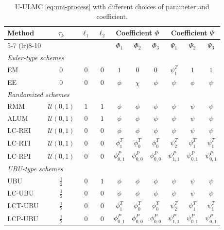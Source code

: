 \documentclass[12pt]{article}
\numberwithin{equation}{section}
\begin{document}
\begin{table}[!htb]
    \centering
    \caption{U-ULMC \eqref{eq:uni-process} with different choices of parameter and coefficient.}
    \label{tab:unified-ulmc}
    \renewcommand{\arraystretch}{1.25}
    \setlength{\tabcolsep}{3.5pt}
    \small
    \begin{tabular*}{\textwidth}{@{\extracolsep{\fill}} lccccccccc @{}}
        \toprule
        \multirow{2}{*}{Method} & \multirow{2}{*}{$\tau_k$} & \multirow{2}{*}{$\ell_1$} & \multirow{2}{*}{$\ell_2$} & \multicolumn{3}{c}{Coefficient $\Phi$} & \multicolumn{3}{c}{Coefficient $\Psi$} \\
        \cmidrule(lr){5-7} \cmidrule(lr){8-10}
        & & & & $\Phi_1$ & $\Phi_2$ & $\Phi_3$ & $\Psi_1$ & $\Psi_2$ & $\Psi_3$ \\
        \midrule
        \multicolumn{10}{l}{\textit{Euler-type schemes}} \\
        \addlinespace[2pt]
        EM  & $0$ & $0$ & $0$ & $1$ & $0$ & $0$ & $\psi^{T}_1$ & $1$ & $1$ \\
        EE  & $0$ & $0$ & $0$ & $\phi$ & $\chi$ & $\phi$ & $\psi$ & $\phi$ & $\psi$ \\
        \midrule
        \multicolumn{10}{l}{\textit{Randomized schemes}} \\
        \addlinespace[2pt]
        RMM     & $\mathcal{U}(0,1)$ & $1$ & $1$ & $\phi$ & $\phi$ & $\phi$ & $\psi$ & $\psi$ & $\psi$ \\
        ALUM    & $\mathcal{U}(0,1)$ & $0$ & $1$ & $\phi$ & $\phi$ & $\phi$ & $\psi$ & $\psi$ & $\psi$ \\
        LC-REI  & $\mathcal{U}(0,1)$ & $0$ & $0$ & $\phi$ & $\phi$ & $\phi$ & $\psi$ & $\psi$ & $\psi$ \\
        LC-RTI  & $\mathcal{U}(0,1)$ & $0$ & $0$ & $\phi^{T}_1$ & $\phi^{T}_0$ & $\phi^{T}_0$ & $\psi^{T}_2$ & $\psi^{T}_1$ & $\psi^{T}_1$ \\
        LC-RPI  & $\mathcal{U}(0,1)$ & $0$ & $0$ & $\phi^{P}_{0,1}$ & $\phi^{P}_{0,0}$ & $\phi^{P}_{0,0}$ & $\psi^{P}_{1,1}$ & $\psi^{P}_{0,1}$ & $\psi^{P}_{0,1}$ \\
        \midrule
        \multicolumn{10}{l}{\textit{UBU-type schemes}} \\
        \addlinespace[2pt]
        UBU           & $\frac{1}{2}$ & $0$ & $1$ & $\phi$ & $\phi$ & $\phi$ & $\psi$ & $\psi$ & $\psi$ \\
        LC-UBU        & $\frac{1}{2}$ & $0$ & $0$ & $\phi$ & $\phi$ & $\phi$ & $\psi$ & $\psi$ & $\psi$ \\
        LCT-UBU & $\frac{1}{2}$ & $0$ & $0$ & $\phi^{T}_1$ & $\phi^{T}_0$ & $\phi^{T}_0$ & $\psi^{T}_2$ & $\psi^{T}_1$ & $\psi^{T}_1$ \\
        LCP-UBU & $\frac{1}{2}$ & $0$ & $0$ & $\phi^{P}_{0,1}$ & $\phi^{P}_{0,0}$ & $\phi^{P}_{0,0}$ & $\psi^{P}_{1,1}$ & $\psi^{P}_{0,1}$ & $\psi^{P}_{0,1}$ \\
        \bottomrule
    \end{tabular*}
\end{table}
\end{document}
